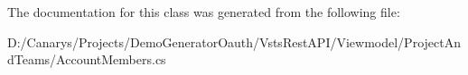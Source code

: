 The documentation for this class was generated from the following file\+:\begin{DoxyCompactItemize}
\item 
D\+:/\+Canarys/\+Projects/\+Demo\+Generator\+Oauth/\+Vsts\+Rest\+A\+P\+I/\+Viewmodel/\+Project\+And\+Teams/Account\+Members.\+cs\end{DoxyCompactItemize}
